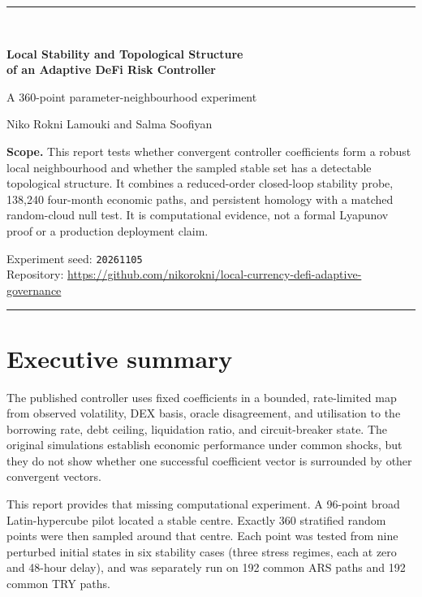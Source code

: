 \documentclass[11pt,a4paper]{article}
\newcommand{\code}[1]{\texttt{#1}}
\begin{document}
\begin{titlepage}
\centering
\vspace*{1.2cm}
{\color{navy}\rule{\textwidth}{1.3pt}}\\[1.1cm]
{\Huge\bfseries Local Stability and Topological Structure\\[0.3cm]
of an Adaptive DeFi Risk Controller\par}
\vspace{0.6cm}
{\Large A 360-point parameter-neighbourhood experiment\par}
\vspace{1.0cm}
{\large Niko Rokni Lamouki \quad and \quad Salma Soofiyan\par}
\vfill
\begin{minipage}{0.84\textwidth}
\colorbox{light}{\parbox{0.94\textwidth}{
\textbf{Scope.} This report tests whether convergent controller coefficients
form a robust local neighbourhood and whether the sampled stable set has a
detectable topological structure. It combines a reduced-order closed-loop
stability probe, 138,240 four-month economic paths, and persistent homology with
a matched random-cloud null test. It is computational evidence, not a formal
Lyapunov proof or a production deployment claim.
}}
\end{minipage}
\vfill
{\large Experiment seed: \code{20261105}\\[0.2cm]
Repository: \url{https://github.com/nikorokni/local-currency-defi-adaptive-governance}}
\vspace{0.7cm}
{\color{navy}\rule{\textwidth}{1.3pt}}
\end{titlepage}

\tableofcontents
\clearpage
{}

\section{Executive summary}

The published controller uses fixed coefficients in a bounded, rate-limited
map from observed volatility, DEX basis, oracle disagreement, and utilisation
to the borrowing rate, debt ceiling, liquidation ratio, and circuit-breaker
state. The original simulations establish economic performance under common
shocks, but they do not show whether one successful coefficient vector is
surrounded by other convergent vectors.

This report provides that missing computational experiment. A 96-point broad
Latin-hypercube pilot located a stable centre. Exactly 360 stratified random
points were then sampled around that centre. Each point was tested from nine
perturbed initial states in six stability cases (three stress regimes, each at
zero and 48-hour delay), and was separately run on 192 common ARS paths and 192
common TRY paths.
\end{document}
